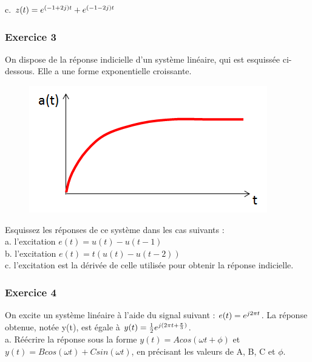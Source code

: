 \begin{remark}{}
	c. $z(t) = e^{(-1+2j)t}+e^{(-1-2j)t}$
	
	\vspace{1\baselineskip}
	
	
	
	\subsubsection{Exercice 3}
	
	On dispose de la réponse indicielle d'un système linéaire, qui est esquissée ci-dessous. Elle a une forme exponentielle croissante.\\
	
	\begin{figure}[htbp]
          \centering \includegraphics[scale=0.5]{images/Exo_2_3.png}
	\end{figure}
	
	Esquissez les réponses de ce système dans les cas suivants :\\
	
	a. l'excitation $e(t)=u(t)-u(t-1)$\\
	
	b. l'excitation $e(t)=t(u(t)-u(t-2))$\\
	
	c. l'excitation est la dérivée de celle utilisée pour obtenir la réponse indicielle.\\
	
	\subsubsection{Exercice 4}
	
	On excite un système linéaire à l'aide du signal suivant : $e(t)=e^{j2\pi t}$. La réponse obtenue, notée y(t), est égale à $y(t)=\frac{1}{2}e^{j(2\pi t+\frac{\pi}{3})}$.\\
	
	a. Réécrire la réponse sous la forme $y(t)=Acos(\omega t + \phi)$ et $y(t)=Bcos(\omega t)+Csin(\omega t)$, en précisant les valeurs de A, B, C et $\phi$.\\
	

\end{remark}
